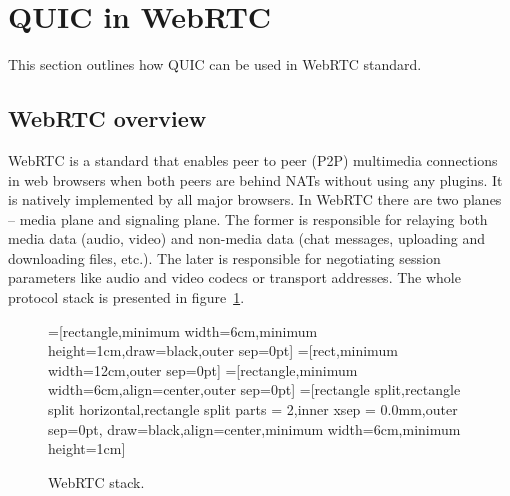 \section{QUIC in WebRTC}
\label{sec:quic-in-webrtc}
This section outlines how QUIC can be used in WebRTC standard.

\subsection{WebRTC overview}
\label{subsec:webrtc-overview}
WebRTC is a standard that enables peer to peer (P2P) multimedia connections in web browsers when both peers are behind NATs without using any plugins.
It is natively implemented by all major browsers.
In WebRTC there are two planes -- media plane and signaling plane.
The former is responsible for relaying both media data (audio, video) and non-media data (chat messages, uploading and downloading files, etc.).
The later is responsible for negotiating session parameters like audio and video codecs or transport addresses.
The whole protocol stack is presented in figure~\ref{fig:webrtc-stack}.

\begin{figure}
    \centering
    =[rectangle,minimum width=6cm,minimum height=1cm,draw=black,outer sep=0pt]
    =[rect,minimum width=12cm,outer sep=0pt]
    =[rectangle,minimum width=6cm,align=center,outer sep=0pt]
    =[rectangle split,rectangle split horizontal,rectangle split parts = 2,inner xsep = 0.0mm,outer sep=0pt,
    draw=black,align=center,minimum width=6cm,minimum height=1cm]
    \caption{WebRTC stack.}
    \label{fig:webrtc-stack}
\end{figure}

